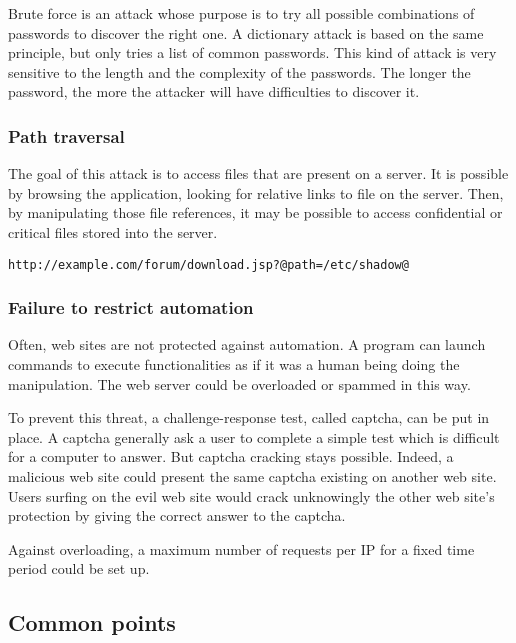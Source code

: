 Brute force is an attack whose purpose is to try all possible combinations of
passwords to discover the right one. A dictionary attack is based on the same
principle, but only tries a list of common passwords.
This kind of attack is very sensitive to the length and the complexity of the
passwords. The longer the password, the more the attacker will have
difficulties to discover it.

\subsubsection{Path traversal}

The goal of this attack is to access files that are present on a server. It
is possible by browsing the application, looking for relative links to file on
the server. Then, by manipulating those file references, it may be possible to
access confidential or critical files stored into the server.

\begin{lstlisting}[style=beamer,
	caption={Getting a file from the server}]
http://example.com/forum/download.jsp?@path=/etc/shadow@
\end{lstlisting}

\subsubsection{Failure to restrict automation}

Often, web sites are not protected against automation. A program can launch
commands to execute functionalities as if it was a human being doing the
manipulation. The web server could be overloaded or spammed in this way.

To prevent this threat, a challenge-response test, called captcha, can be put
in place. A captcha generally ask a user to complete a simple test which is
difficult for a computer to answer. But captcha cracking stays possible.
Indeed, a malicious web site could present the same captcha existing on
another web site. Users surfing on the evil web site would crack unknowingly
the other web site's protection by giving the correct answer to the captcha.

Against overloading, a maximum number of requests per IP for a fixed time
period could be set up.

\subsection{Common points}

